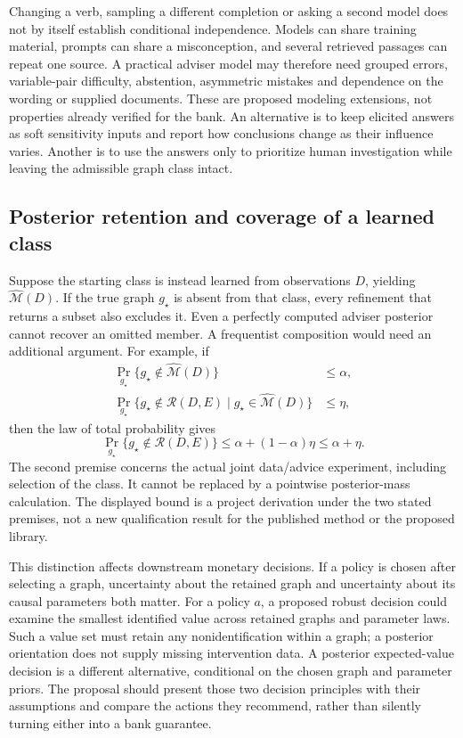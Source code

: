 Changing a verb, sampling a different completion or asking a second model does
not by itself establish conditional independence. Models can share training
material, prompts can share a misconception, and several retrieved passages
can repeat one source. A practical adviser model may therefore need grouped
errors, variable-pair difficulty, abstention, asymmetric mistakes and dependence
on the wording or supplied documents. These are proposed modeling extensions,
not properties already verified for the bank. An alternative is to keep
elicited answers as soft sensitivity inputs and report how conclusions change
as their influence varies. Another is to use the answers only to prioritize
human investigation while leaving the admissible graph class intact.

\subsection{Posterior retention and coverage of a learned class}

Suppose the starting class is instead learned from observations $D$, yielding
$\widehat{\mathcal M}(D)$. If the true graph $g_\star$ is absent from that
class, every refinement that returns a subset also excludes it. Even a
perfectly computed adviser posterior cannot recover an omitted member. A
frequentist composition would need an additional argument. For example, if
\begin{equation}
\begin{split}
 \Pr_{g_\star}\{g_\star\notin\widehat{\mathcal M}(D)\}&\leq\alpha,\\
 \Pr_{g_\star}\{g_\star\notin\mathcal R(D,E)
       \mid g_\star\in\widehat{\mathcal M}(D)\}&\leq\eta,
\end{split}
\label{exec17:advice-coverage-premises}
\end{equation}
then the law of total probability gives
\begin{equation}
 \Pr_{g_\star}\{g_\star\notin\mathcal R(D,E)\}
       \leq\alpha+(1-\alpha)\eta\leq\alpha+\eta.
\label{exec17:advice-coverage-composition}
\end{equation}
The second premise concerns the actual joint data/advice experiment, including
selection of the class. It cannot be replaced by a pointwise posterior-mass
calculation. The displayed bound is a project derivation under the two stated
premises, not a new qualification result for the published method or the
proposed library.

This distinction affects downstream monetary decisions. If a policy is chosen
after selecting a graph, uncertainty about the retained graph and uncertainty
about its causal parameters both matter. For a policy $a$, a proposed robust
decision could examine the smallest identified value across retained graphs
and parameter laws. Such a value set must retain any nonidentification within
a graph; a posterior orientation does not supply missing intervention data.
A posterior expected-value decision is a different alternative, conditional
on the chosen graph and parameter priors. The proposal should present those
two decision principles with their assumptions and compare the actions they
recommend, rather than silently turning either into a bank guarantee.

